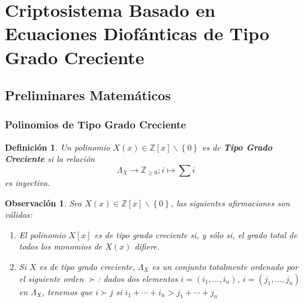 \documentclass[11pt]{article}
\newcommand{\Z}{\mathbb{Z}}
\newcommand{\izq}{\left\{ }
\newcommand{\der}{\right\} }
\numberwithin{equation}{section} %
\numberwithin{figure}{section} %
\numberwithin{table}{section} %
\newtheorem{defi}{{\bf Definici\'on }}[subsection]
\newtheorem{obs}{{\bf Observaci\'on }}[subsection]
\begin{document}
	\section{Criptosistema Basado en Ecuaciones Diof\'anticas de Tipo Grado Creciente}

		\subsection{Preliminares Matem\'aticos}
		\label{52Prel}

			\subsubsection{Polinomios de Tipo Grado Creciente}
			\label{521TGC}

				\begin{defi}
					Un polinomio $X(x)\in\Z[x]\backslash \izq 0\der$ es de \textbf{Tipo Grado Creciente} si la relaci\'on
					$$
						\Lambda_X\rightarrow \Z_{\geq 0}; i\mapsto \sum i
					$$
					es inyectiva.
				\end{defi}
		
				\begin{obs}
					Sea $X(x)\in\Z[x]\backslash\izq 0\der$, las siguientes afirmaciones son v\'alidas:
					\begin{enumerate}
						\item El polinomio $X[x]$ es de tipo grado creciente si, y s\'olo si, el grado total de todos los monomios de $X(x)$ difiere.
						\item Si $X$ es de tipo grado creciente, $\Lambda_X$ es un conjunto totalmente ordenado por el siguiente orden $\succ$: dados dos elementos $i=(i_1,\ldots,i_n)$, $i=(j_1,\ldots,j_n)$ en $\Lambda_X$, tenemos que $i\succ j$ si $i_1+\cdots+i_n>j_1+\cdots+j_n$ 
					\end{enumerate}
				\end{obs}	
				
\end{document}
